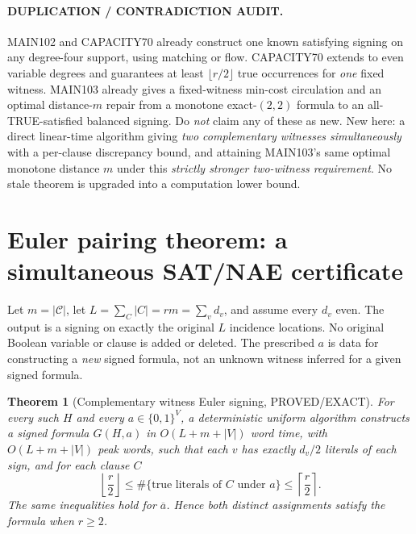 \documentclass[11pt]{article}
\newtheorem{theorem}{Theorem}
\begin{document}
\paragraph{DUPLICATION / CONTRADICTION AUDIT.}
MAIN102 and CAPACITY70 already construct one known satisfying signing on any degree-four support, using matching or flow. CAPACITY70 extends to even variable degrees and guarantees at least \(\lfloor r/2\rfloor\) true occurrences for \emph{one} fixed witness. MAIN103 already gives a fixed-witness min-cost circulation and an optimal distance-\(m\) repair from a monotone exact-$(2,2)$ formula to an all-TRUE-satisfied balanced signing. Do \emph{not} claim any of these as new. New here: a direct linear-time algorithm giving \emph{two complementary witnesses simultaneously} with a per-clause discrepancy bound, and attaining MAIN103's same optimal monotone distance \(m\) under this \emph{strictly stronger two-witness requirement}. No stale theorem is upgraded into a computation lower bound.

\section{Euler pairing theorem: a simultaneous SAT/NAE certificate}
Let \(m=|\mathcal C|\), let \(L=\sum_C|C|=rm=\sum_v d_v\), and assume every \(d_v\) even. The output is a signing on exactly the original \(L\) incidence locations. No original Boolean variable or clause is added or deleted. The prescribed \(a\) is data for constructing a \emph{new} signed formula, not an unknown witness inferred for a given signed formula.

\begin{theorem}[Complementary witness Euler signing, PROVED/EXACT]
For every such \(H\) and every \(a\in\{0,1\}^{V}\), a deterministic uniform algorithm constructs a signed formula \(G(H,a)\) in \(O(L+m+|V|)\) word time, with \(O(L+m+|V|)\) peak words, such that each \(v\) has exactly \(d_v/2\) literals of each sign, and for each clause \(C\)
\[
\left\lfloor\frac r2\right\rfloor
\le \#\{\text{true literals of \(C\) under }a\}
\le\left\lceil\frac r2\right\rceil.
\]
The same inequalities hold for \(\overline a\). Hence both distinct assignments satisfy the formula when \(r\ge2\).
\end{theorem}
\end{document}
